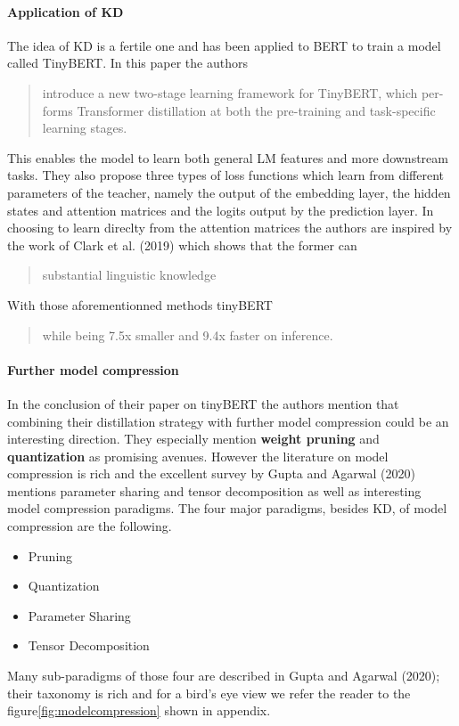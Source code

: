 \documentclass{article}
\begin{document}
\paragraph{Application of KD} The idea of KD is a fertile one and has been
applied to BERT to train a model called TinyBERT\cite{tinybert}. In this paper
the authors \blockcquote{tinybert}{introduce a new two-stage learning framework
for TinyBERT, which per- forms Transformer distillation at both the pre-training
and task-specific learning stages.} This enables the model to learn both general
LM features and more downstream tasks. They also propose three types of loss
functions which learn from different parameters of the teacher, namely the
output of the embedding layer, the hidden states and attention matrices and the
logits output by the prediction layer. In choosing to learn direclty from the
attention matrices the authors are inspired by the work of Clark et al.
(2019)\cite{whatdoesbertlookat} which shows that the former can
\blockcquote{tinybert}{substantial linguistic knowledge}. With those
aforementionned methods tinyBERT \blockcquote{tinybert}{while being
7.5x smaller and 9.4x faster on inference.}


\paragraph{Further model compression} In the conclusion of their paper on
tinyBERT the authors mention that combining their distillation strategy with
further model compression could be an interesting direction. They especially
mention \textbf{weight pruning} and \textbf{quantization} as promising avenues.
However the literature on model compression is rich and the excellent survey by
Gupta and Agarwal (2020)\cite{gupta2020compression} mentions parameter sharing
and tensor decomposition as well as interesting model compression paradigms.
The four major paradigms, besides KD, of model compression are the following.
\begin{itemize}
  \item Pruning
  \item Quantization
  \item Parameter Sharing
  \item Tensor Decomposition
\end{itemize}
Many sub-paradigms of those four are described in Gupta and
Agarwal (2020); their taxonomy is rich and for a bird's eye view we refer the
reader to the figure\ref{fig:modelcompression} shown in appendix.
\end{document}
